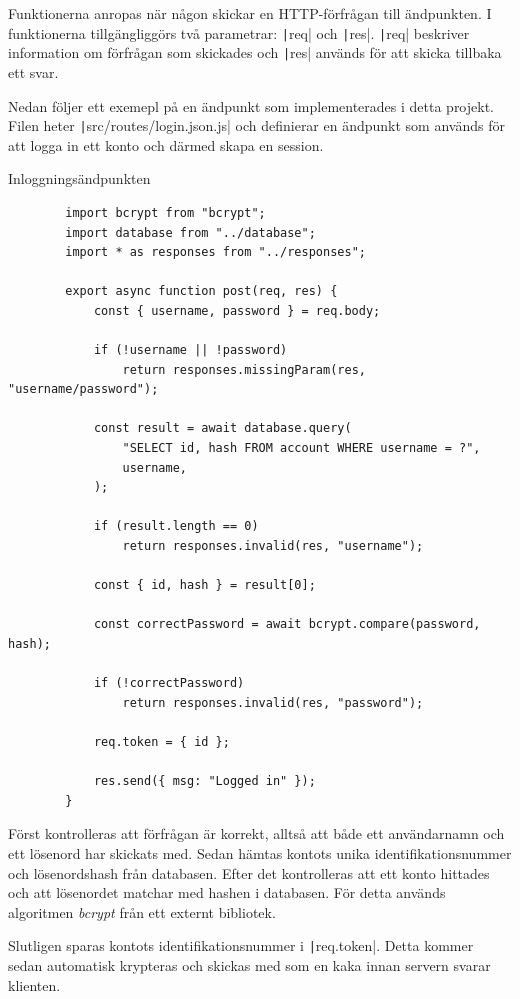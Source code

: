 \documentclass{article}
\begin{document}
Funktionerna anropas när någon skickar en HTTP-förfrågan till ändpunkten. I
funktionerna tillgängliggörs två parametrar:
\texttt|req| och \texttt|res|.
\texttt|req| beskriver information om förfrågan som
skickades och \texttt|res| används för att skicka
tillbaka ett svar.

Nedan följer ett exemepl på en ändpunkt som implementerades i detta projekt.
Filen heter \texttt|src/routes/login.json.js| och definierar en ändpunkt som
används för att logga in ett konto och därmed skapa en session.

\begin{listing}[H]
	\caption{Inloggningsändpunkten}
	\begin{verbatim}
		import bcrypt from "bcrypt";
		import database from "../database";
		import * as responses from "../responses";

		export async function post(req, res) {
			const { username, password } = req.body;

			if (!username || !password)
				return responses.missingParam(res, "username/password");

			const result = await database.query(
				"SELECT id, hash FROM account WHERE username = ?",
				username,
			);

			if (result.length == 0)
				return responses.invalid(res, "username");

			const { id, hash } = result[0];

			const correctPassword = await bcrypt.compare(password, hash);

			if (!correctPassword)
				return responses.invalid(res, "password");

			req.token = { id };

			res.send({ msg: "Logged in" });
		}
	\end{verbatim}
\end{listing}

Först kontrolleras att förfrågan är korrekt, alltså att både ett användarnamn
och ett lösenord har skickats med. Sedan hämtas kontots unika
identifikationsnummer och lösenordshash från databasen. Efter det kontrolleras
att ett konto hittades och att lösenordet matchar med hashen i databasen. För
detta används algoritmen \textit{bcrypt} från ett externt bibliotek.

Slutligen sparas kontots identifikationsnummer i
\texttt|req.token|. Detta
kommer sedan automatisk krypteras och skickas med som en kaka innan servern
svarar klienten.
\end{document}
